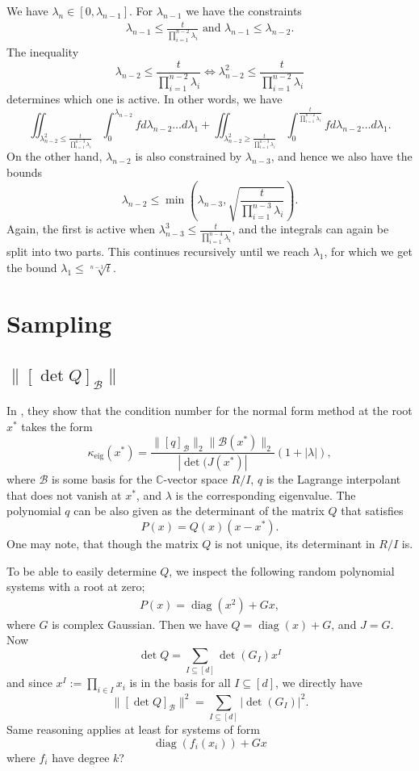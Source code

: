 \documentclass[12pt]{article}
\def\C{\mathbb{C}}
\def\B{\mathcal{B}}
\DeclareMathOperator{\diag}{diag}
\begin{document}
We have $\lambda_n \in [0,\lambda_{n-1}]$. For $\lambda_{n-1}$ we have the constraints
\begin{align*}
    \lambda_{n-1} \leq \frac{t}{\prod_{i=1}^{n-2} \lambda_i} \text{ and } \lambda_{n-1} \leq \lambda_{n-2}.
\end{align*}
The inequality
\[ \lambda_{n-2} \leq \frac{t}{\prod_{i=1}^{n-2} \lambda_i} \Leftrightarrow \lambda_{n-2}^2 \leq \frac{t}{\prod_{i=1}^{n-2} \lambda_i} \]
determines which one is active. In other words, we have
\[ \iint_{\lambda_{n-2}^2 \leq \frac{t}{\prod_{i=1}^{n-3} \lambda_i}} \int_{0}^{\lambda_{n-2}} f d\lambda_{n-2} \dots d\lambda_1 + \iint_{\lambda_{n-2}^2 \geq \frac{t}{\prod_{i=1}^{n-3} \lambda_i}} \int_{0}^{\frac{t}{\prod_{i=1}^{n-2} \lambda_i}} f d\lambda_{n-2} \dots d\lambda_1. \]
On the other hand, $\lambda_{n-2}$ is also constrained by $\lambda_{n-3}$, and hence we also have the bounds
\[ \lambda_{n-2} \leq \min\left( \lambda_{n-3}, \sqrt{\frac{t}{\prod_{i=1}^{n-3} \lambda_i}} \right).  \]
Again, the first is active when $\lambda_{n-3}^3 \leq \frac{t}{\prod_{i=1}^{n-4} \lambda_i}$, and the integrals can again be split into two parts.
This continues recursively until we reach $\lambda_1$, for which we get the bound $\lambda_1 \leq \sqrt[n-1]{t}$.








\section{Sampling}

\subsection{$\| [\det Q]_\B\|$}

In \cite{GT}, they show that the condition number for the normal form method at the root $x^*$ takes the form
\[  \kappa_\mathrm{eig}(x^*) = \frac{\|[q]_\mathcal{B}\|_2 \|\mathcal{B}(x^*)\|_2 }{|\det(J(x^*)|} (1+|\lambda|),  \]
where $\mathcal{B}$ is some basis for the $\C$-vector space $R/I$, $q$ is the Lagrange interpolant that does not vanish at $x^*$, and $\lambda$ is the corresponding eigenvalue.
The polynomial $q$ can be also given as the determinant of the matrix $Q$ that satisfies 
\[ P(x) = Q(x) (x-x^*).  \]
One may note, that though the matrix $Q$ is not unique, its determinant in $R/I$ is.

To be able to easily determine $Q$, we inspect the following random polynomial systems with a root at zero;
\begin{align}
    P(x) = \diag(x^2) + Gx, \label{eq:diagsys}
\end{align}  
where $G$ is complex Gaussian. Then  we have $Q = \diag(x) + G$, and $J = G$. Now   
    \[  \det Q = \sum_{I \subseteq [d]} \det(G_I) x^I \]
    and since $x^I := \prod_{i\in I} x_i$ is in the basis for all $I \subseteq [d]$, we directly have
    \[ \| [ \det Q]_\B \|^2 = \sum_{I \subseteq [d]} |\det(G_I)|^2. \]
Same reasoning applies at least for systems of form
\[  \diag (f_i(x_i)) + Gx  \]
where $f_i$ have degree $k$? 
\end{document}
